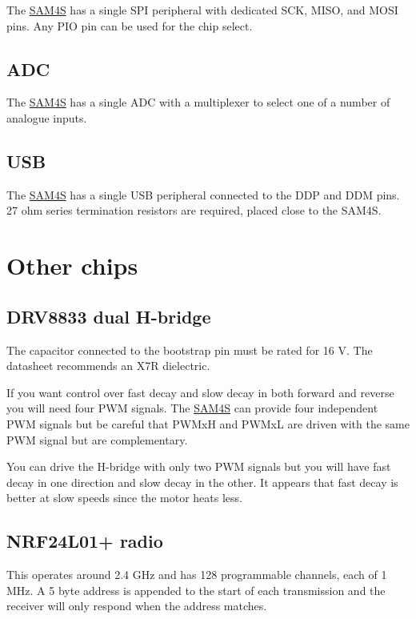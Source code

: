 The \url{SAM4S} has a single SPI peripheral with dedicated SCK, MISO,
and MOSI pins. Any PIO pin can be used for the chip select.

\subsection{ADC}\label{adc}

The \url{SAM4S} has a single ADC with a multiplexer to select one of a
number of analogue inputs.

\subsection{USB}\label{usb}

The \url{SAM4S} has a single USB peripheral connected to the DDP and DDM
pins. 27 ohm series termination resistors are required, placed close to
the SAM4S.

\section{Other chips}\label{other-chips}

\subsection{DRV8833 dual H-bridge}\label{drv8833-dual-h-bridge}

The capacitor connected to the bootstrap pin must be rated for 16 V. The
datasheet recommends an X7R dielectric.

If you want control over fast decay and slow decay in both forward and
reverse you will need four PWM signals. The \url{SAM4S} can provide four
independent PWM signals but be careful that PWMxH and PWMxL are driven
with the same PWM signal but are complementary.

You can drive the H-bridge with only two PWM signals but you will have
fast decay in one direction and slow decay in the other. It appears that
fast decay is better at slow speeds since the motor heats less.

\subsection{NRF24L01+ radio}\label{nrf24l01-radio}

This operates around 2.4 GHz and has 128 programmable channels, each of
1 MHz. A 5 byte address is appended to the start of each transmission
and the receiver will only respond when the address matches.

